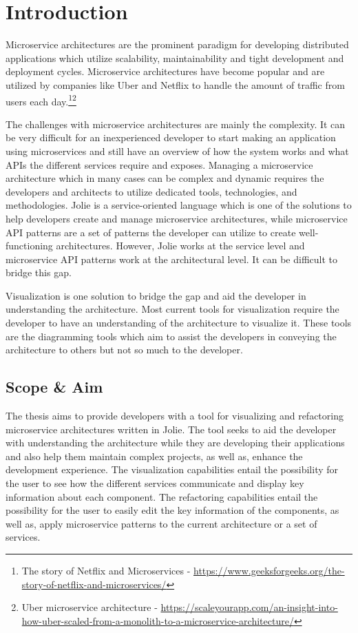 \chapter{Introduction}
Microservice architectures are the prominent paradigm for developing distributed applications which utilize scalability, maintainability and tight development and deployment cycles.
Microservice architectures have become popular and are utilized by companies like Uber and Netflix
to handle the amount of traffic from users each day.\footnote{The story of Netflix and Microservices - \url{https://www.geeksforgeeks.org/the-story-of-netflix-and-microservices/}}\footnote{Uber microservice architecture - \url{https://scaleyourapp.com/an-insight-into-how-uber-scaled-from-a-monolith-to-a-microservice-architecture/}}


The challenges with microservice architectures are mainly the complexity. It can be very difficult for an inexperienced developer to start making an application using microservices and still have an overview of how the system works and what APIs the different services require and exposes.
Managing a microservice architecture which in many cases can be complex and dynamic requires the developers and architects to utilize dedicated tools, technologies, and methodologies.
Jolie \cite{jolie} is a service-oriented language which is one of the solutions to help developers create and manage microservice architectures, while microservice API patterns\cite*{PatternsForAPIDesign:2022} are a set of patterns the developer can utilize to create well-functioning architectures.
However, Jolie works at the service level and microservice API patterns work at the architectural level. It can be difficult to bridge this gap.

Visualization is one solution to bridge the gap and aid the developer in understanding the architecture.
Most current tools for visualization require the developer to have an understanding of the architecture to visualize it.
These tools are the diagramming tools which aim to assist the developers in conveying the architecture to others but not so much to the developer.

\section{Scope \& Aim}
The thesis aims to provide developers with a tool for visualizing and refactoring microservice architectures written in Jolie. The tool seeks to aid the developer with understanding the architecture while they are developing their applications and also 
help them maintain complex projects, as well as, enhance the development experience.
The visualization capabilities entail the possibility for the user to see how the different services communicate and display key information about each component.
The refactoring capabilities entail the possibility for the user to easily edit the key information of the components, as well as, apply microservice patterns to the current architecture or a set of services.

